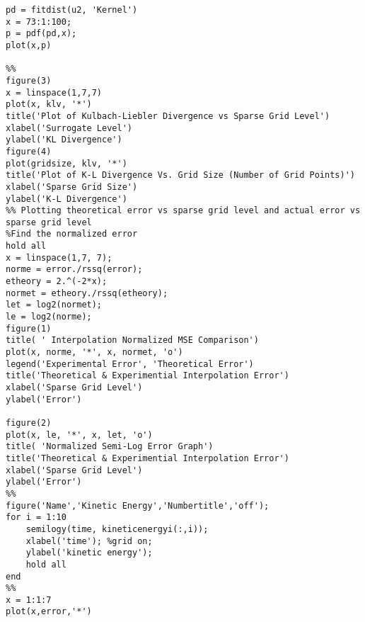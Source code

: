 \documentclass{article}
\begin{document}
\begin{lstlisting}
pd = fitdist(u2, 'Kernel')
x = 73:1:100;
p = pdf(pd,x);
plot(x,p)

%%
figure(3)
x = linspace(1,7,7)
plot(x, klv, '*')
title('Plot of Kulbach-Liebler Divergence vs Sparse Grid Level')
xlabel('Surrogate Level')
ylabel('KL Divergence')
figure(4)
plot(gridsize, klv, '*')
title('Plot of K-L Divergence Vs. Grid Size (Number of Grid Points)')
xlabel('Sparse Grid Size')
ylabel('K-L Divergence')
%% Plotting theoretical error vs sparse grid level and actual error vs sparse grid level
%Find the normalized error
hold all
x = linspace(1,7, 7);
norme = error./rssq(error);
etheory = 2.^(-2*x);
normet = etheory./rssq(etheory);
let = log2(normet);
le = log2(norme);
figure(1)
title( ' Interpolation Normalized MSE Comparison')
plot(x, norme, '*', x, normet, 'o')
legend('Experimental Error', 'Theoretical Error')
title('Theoretical & Experimential Interpolation Error')
xlabel('Sparse Grid Level')
ylabel('Error')

figure(2)
plot(x, le, '*', x, let, 'o')
title( 'Normalized Semi-Log Error Graph')
title('Theoretical & Experimential Interpolation Error')
xlabel('Sparse Grid Level')
ylabel('Error')
%%
figure('Name','Kinetic Energy','Numbertitle','off');
for i = 1:10
    semilogy(time, kineticenergyi(:,i));
    xlabel('time'); %grid on;
    ylabel('kinetic energy');
    hold all
end
%%
x = 1:1:7
plot(x,error,'*')
\end{lstlisting}




\medskip


\end{document}
